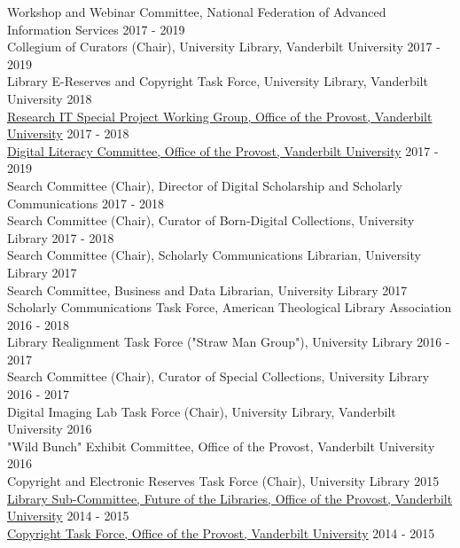 \documentclass[]{res} %
\begin{document}
\begin{resume}
Workshop and Webinar Committee, National Federation of Advanced Information Services \hfill 2017 - 2019\\
Collegium of Curators (Chair), University Library, Vanderbilt University  \hfill 2017 - 2019\\
Library E-Reserves and Copyright Task Force, University Library, Vanderbilt University \hfill 2018 \\
\href{https://news.vanderbilt.edu/2017/03/17/new-working-group-to-assess-and-prioritize-opportunities-for-enhancing-research-it-resources-on-campus/}{Research IT Special Project Working Group, Office of the Provost, Vanderbilt University} \hfill 2017 - 2018 \\
\href{https://www.vanderbilt.edu/ed-tech/committees/digital-literacy-committee.php}{Digital Literacy Committee, Office of the Provost, Vanderbilt University} \hfill 2017 - 2019\\
Search Committee (Chair), Director of Digital Scholarship and Scholarly Communications \hfill 2017 - 2018 \\
Search Committee (Chair), Curator of Born-Digital Collections, University Library \hfill 2017 - 2018 \\
Search Committee (Chair), Scholarly Communications Librarian, University Library \hfill 2017 \\
Search Committee, Business and Data Librarian, University Library \hfill 2017 \\
Scholarly Communications Task Force, American Theological Library Association \hfill 2016 - 2018 \\
Library Realignment Task Force ("Straw Man Group"), University Library \hfill 2016 - 2017 \\
Search Committee (Chair), Curator of Special Collections, University Library \hfill 2016 - 2017 \\
Digital Imaging Lab Task Force (Chair), University Library, Vanderbilt University \hfill 2016 \\
"Wild Bunch" Exhibit Committee, Office of the Provost, Vanderbilt University \hfill 2016 \\
Copyright and Electronic Reserves Task Force (Chair), University Library \hfill 2015 \\
\href{https://www.library.vanderbilt.edu/future/}{Library Sub-Committee, Future of the Libraries, Office of the Provost, Vanderbilt University} \hfill 2014 - 2015 \\
\href{http://news.vanderbilt.edu/2015/09/new-videos-on-copyright-law-help-users- balance-fair-use-considerations/}{Copyright Task Force, Office of the Provost, Vanderbilt University} \hfill 2014 - 2015 \\

\end{resume}
\end{document}
